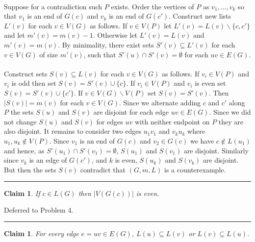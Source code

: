\documentclass[letterpaper,12pt,oneside,onecolumn]{article}
\newenvironment{proof}{{\bf Proof:  }}{\hfill\rule{2mm}{2mm}}
\newtheorem{claim}[fact]{Claim}
\begin{document}
	\begin{proof}
		\paragraph{} Suppose for a contradiction such $P$ exists. Order the vertices of $P$ as $v_1, \dots, v_k$ so that $v_1$ is an end of $G(c)$ and $v_k$ is an end of $G(c')$. Construct new lists $L'(v)$ for each $v \in V(G)$ as follows. If $v \in V(P)$ let $L'(v) = L(v) \backslash \{c,c'\}$ and let $m'(v) = m(v) - 1$. Otherwise let $L'(v) = L(v)$ and $m'(v) = m(v)$. By minimality, there exist sets $S'(v) \subseteq L'(v)$ for each $v \in V(G)$ of size $m'(v)$, such that $S'(u) \cap S'(v) = \emptyset$ for each $uv \in E(G)$.
		\paragraph{}
		Construct sets $S(v)\subseteq L(v)$ for each $v \in V(G)$ as follows. If $v_i \in V(P)$ and $v_i$ is odd then set $S(v) = S'(v) \cup \{c\}$. If $v_i \in V(P)$ and $v_i$ is even set $S(v) = S'(v) \cup \{c'\}$. If $v \in V(G)\backslash V(P)$ set $S(v) = S'(v)$. Then $|S(v)| = m(v)$ for each $v \in V(G)$. Since we alternate adding $c$ and $c'$ along $P$ the sets $S(u)$ and $S(v)$ are disjoint for each edge $uv \in E(G)$. Since we did not change $S(u)$ and $S(v)$ for edges $uv$ with neither endpoint on $P$ they are also disjoint. It remains to consider two edges $u_1v_1$ and $v_ku_k$ where $u_1, u_k \not\in V(P)$. Since $v_1$ is an end of $G(c)$ and $v_2 \in G(c)$ we have $c \not\in L(u_1)$ and hence, as $S'(u_1) \cap S'(v_1) = \emptyset$, $S(u_1)$ and $S(v_1)$ are disjoint. Similarly since $v_k$ is an edge of $G(c')$, and $k$ is even, $S(u_k)$ and $S(v_k)$ are disjoint. But then the sets $S(v)$ contradict that $(G,m,L)$ is a counterexample.
	\end{proof}
\begin{claim}
	If $c \in L(G)$ then $|V(G(c))|$ is even.
\end{claim}
\begin{proof}
	Deferred to Problem $4$.
\end{proof}
\begin{claim}
	For every edge $e=uv \in E(G)$, $L(u) \subseteq L(v)$ or $L(v) \subseteq L(u)$.
\end{claim}
\end{document}
